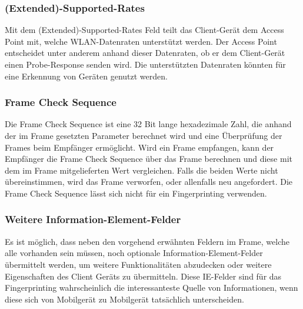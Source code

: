 \subsubsection*{(Extended)-Supported-Rates}
Mit dem (Extended)-Supported-Rates Feld teilt das Client-Gerät dem Access Point
mit, welche WLAN-Datenraten unterstützt werden. 
Der Access Point entscheidet unter anderem anhand dieser Datenraten, 
ob er dem Client-Gerät einen Probe-Response senden wird.
Die unterstützten Datenraten könnten für eine Erkennung von Geräten genutzt werden.

\clearpage 

\subsubsection*{Frame Check Sequence}
Die Frame Check Sequence ist eine 32 Bit lange hexadezimale Zahl, die anhand
der im Frame gesetzten Parameter berechnet wird und eine Überprüfung der 
Frames beim Empfänger ermöglicht. Wird ein Frame empfangen, kann der Empfänger
die Frame Check Sequence über das Frame berechnen und diese mit dem im Frame
mitgelieferten Wert vergleichen. Falls die beiden Werte nicht übereinstimmen,
wird das Frame verworfen, oder allenfalls neu angefordert.
Die Frame Check Sequence lässt sich nicht für ein Fingerprinting verwenden.

\subsubsection*{Weitere Information-Element-Felder}
Es ist möglich, dass neben den vorgehend erwähnten Feldern im Frame, 
welche alle vorhanden sein müssen, noch optionale Information-Element-Felder
übermittelt werden, um weitere Funktionalitäten abzudecken oder weitere
Eigenschaften des Client Geräts zu übermitteln.
Diese IE-Felder sind für das Fingerprinting wahrscheinlich die interessanteste
Quelle von Informationen, wenn diese sich von Mobilgerät zu Mobilgerät 
tatsächlich unterscheiden.

\clearpage
